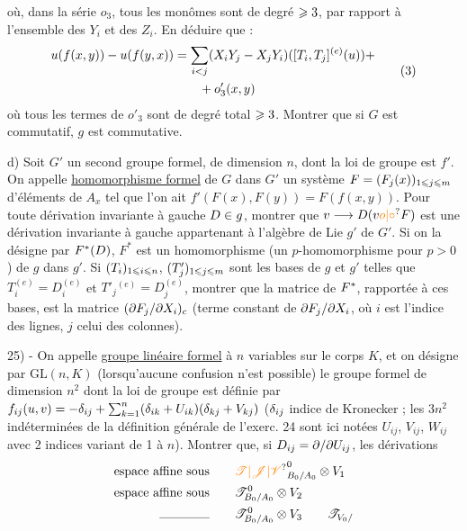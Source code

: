 où, dans la série $o_3$, tous les monômes sont de degré $\geqslant3$, par rapport à l'ensemble des $Y_i$ et des $Z_i$. En déduire que :
\[
\begin{aligned}
u(f(x,y))-u(f(y,x))&=\sum_{i<j}(X_iY_j-X_jY_i)([T_i,T_j]^{(e)}(u))+\\
&\qquad +o'_3(x,y)
\end{aligned}\tag*{(3)}
\]
où tous les termes de $o'_3$ sont de degré total $\geqslant3$. Montrer que si $G$ est commutatif, $g$ est commutative.

d) Soit $G'$ un second groupe formel, de dimension $n$, dont la loi de groupe est $f'$. On appelle \uline{homomorphisme formel} de $G$ dans $G'$ un système $F=(F_j(x))_{1\leqslant j\leqslant m}$ d'éléments de $A_x$ tel que l'on ait $f'(F(x),F(y))=F(f(x,y))$. Pour toute dérivation invariante à gauche $D\in g$, montrer que $v\handwritten{\longrightarrow}D(v\unsure{o|\circ}F)$ est une dérivation invariante à gauche appartenant à l'algèbre de Lie $g'$ de $G'$. Si on la désigne par $F^{*}(D)$, $F^*$ est un homomorphisme (un $p$-homomorphisme pour $p>0$) de $g$ dans $g'$. Si $(T_i)_{1\leqslant i\leqslant n}$, $(T'_j)_{1\leqslant j\leqslant m}$ sont les bases de $g$ et $g'$ telles que $T_i^{(e)}=D_i^{(e)}$ et $T'_j{}^{(e)}=D_j^{(e)}$, montrer que la matrice de $F^{*}$, rapportée à ces bases, est la matrice $(\partial F_j/\partial X_i)_c$ (terme constant de $\partial F_j/\partial X_i$, où $i$ est l'indice des lignes, $j$ celui des colonnes).

25) - On appelle \uline{groupe linéaire formel} à $n$ variables sur le corps $K$, et on désigne par $\mathrm{GL}(n,K)$ (lorsqu'aucune confusion n'est possible) le groupe formel de dimension $n^2$ dont la loi de groupe est définie par $f_{ij}(u,v)=-\delta_{ij}+\sum_{k=1}^{n}(\delta_{ik}+U_{ik})(\delta_{kj}+V_{kj})$ ($\delta_{ij}$ indice de Kronecker ; les $3n^2$ indéterminées de la définition générale de l'exerc. 24 sont ici notées $U_{ij}$, $V_{ij}$, $W_{ij}$ avec 2 indices variant de 1 à $n$). Montrer que, si $D_{ij}=\partial/\partial U_{ij}$, les dérivations
\[
\begin{aligned}
\text{espace affine sous}\qquad&\unsure{\mathscr T|\mathscr J|\mathscr V}^{0}_{B_0/A_0}\otimes V_1\\
\text{espace affine sous}\qquad&\mathscr T^{0}_{B_0/A_0}\otimes V_2\\
\text{\rule{4em}{0.3pt}}\qquad&\mathscr T^{0}_{B_0/A_0}\otimes V_3\qquad\mathscr T_{V_0/}
\end{aligned}
\]

